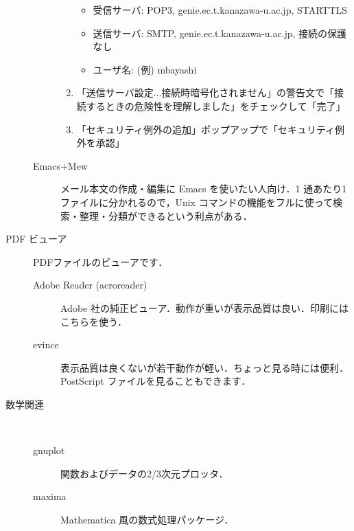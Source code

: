 \documentclass[main]{subfiles}
\begin{document}
\begin{description}
\begin{description}
\begin{enumerate}[itemsep=0.8em]
\begin{itemize}
                    \item 受信サーバ: POP3, genie.ec.t.kanazawa-u.ac.jp, STARTTLS

                    \item 送信サーバ: SMTP, genie.ec.t.kanazawa-u.ac.jp, 接続の保護なし

                    \item ユーザ名: (例) mbayashi
               
                \end{itemize}

            \item 「送信サーバ設定...接続時暗号化されません」の警告文で「接続するときの危険性を理解しました」をチェックして「完了」

            \item 「セキュリティ例外の追加」ポップアップで「セキュリティ例外を承認」

        \end{enumerate}

        \item [\textrm{Emacs+Mew}] メール本文の作成・編集に Emacs を使いたい人向け．1 通あたり1ファイルに分かれるので，Unix コマンドの機能をフルに使って検索・整理・分類ができるという利点がある．

    \end{description}

    \item[\textrm{PDF} ビューア] PDFファイルのビューアです．  

    \begin{description}
        
        \item[\textrm{Adobe Reader (acroreader)}] Adobe 社の純正ビューア．動作が重いが表示品質は良い．印刷にはこちらを使う．

        \item[\textrm{evince}] 表示品質は良くないが若干動作が軽い．ちょっと見る時には便利．PostScript ファイルを見ることもできます．
    
    \end{description}

    \item[数学関連] 　

    \begin{description}

        \item[\textrm{gnuplot}] 関数およびデータの2/3次元プロッタ．

        \item[\textrm{maxima}] Mathematica 風の数式処理パッケージ．
        

\end{description}
\end{description}
\end{document}
